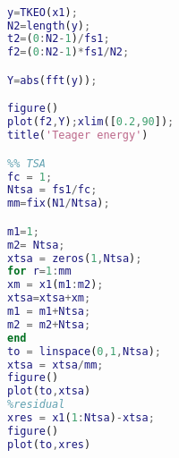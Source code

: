 \begin{lstlisting}[language=Matlab,
	keywordstyle=\color{blue!70},
	commentstyle=\color{red!50!green!50!blue!50}]
%% Teager energy operator

y=TKEO(x1);
N2=length(y);
t2=(0:N2-1)/fs1;
f2=(0:N2-1)*fs1/N2;

Y=abs(fft(y));

figure()
plot(f2,Y);xlim([0.2,90]);
title('Teager energy')

%% TSA
fc = 1;
Ntsa = fs1/fc;
mm=fix(N1/Ntsa);

m1=1;
m2= Ntsa;
xtsa = zeros(1,Ntsa);
for r=1:mm
xm = x1(m1:m2);
xtsa=xtsa+xm;
m1 = m1+Ntsa;
m2 = m2+Ntsa;
end
to = linspace(0,1,Ntsa);
xtsa = xtsa/mm;
figure()
plot(to,xtsa)
%residual
xres = x1(1:Ntsa)-xtsa;
figure()
plot(to,xres)

\end{lstlisting}


